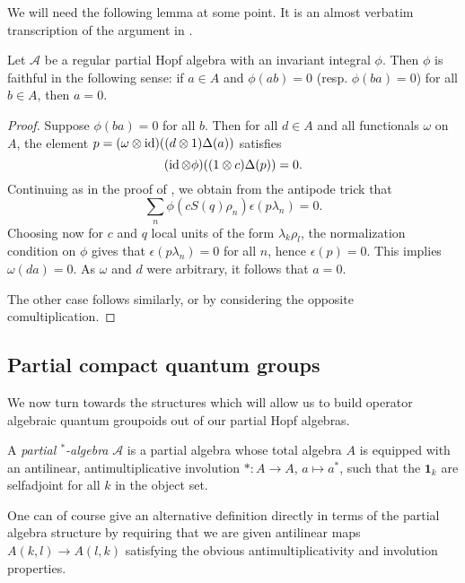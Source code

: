 We will need the following lemma at some point. It is an almost verbatim transcription of the argument in \cite[Proposition 3.4]{VDae2}.

\begin{Lem}\label{LemFaith} Let $\mathscr{A}$ be a regular partial Hopf
  algebra with an invariant integral $\phi$. Then
  $\phi$ is faithful in the following sense: if $a\in A$ and
  $\phi(ab) =0$ (resp. $\phi(ba)=0$) for all $b\in A$, then
  $a=0$.
\end{Lem} 
\begin{proof} Suppose  $\phi(ba)=0$ for all $b$. Then for all $d\in A$ and all functionals $\omega$ on $A$, the element $p = (\omega\otimes \operatorname{id})((d\otimes 1)\Delta(a))$ satisfies \[(\operatorname{id}\otimes \phi)((1\otimes c)\Delta(p)) = 0.\] Continuing as in the proof of \cite[Proposition 3.4]{VDae2}, we obtain from the antipode trick that \[\sum_n \phi(cS(q)\rho_n)\epsilon(p\lambda_n)=0.\] Choosing now for $c$ and $q$ local units of the form $\lambda_k\rho_l$, the normalization condition on $\phi$ gives that $\epsilon(p\lambda_n)=0$ for all $n$, hence $\epsilon(p)=0$. This implies $\omega(da)=0$. As $\omega$ and $d$ were arbitrary, it follows that $a=0$.

The other case follows similarly, or by considering the opposite comultiplication.
\end{proof} 



\subsection{Partial compact quantum groups}

We now turn towards the structures which will allow us to build operator algebraic quantum groupoids out of our partial Hopf algebras.

\begin{Def} A \emph{partial $^*$-algebra} $\mathscr{A}$ is a partial
  algebra whose total algebra $A$ is equipped with an antilinear,
  antimultiplicative involution $*\colon A\rightarrow A$, $ a\mapsto
  a^*$,  such that the $\mathbf{1}_k$ are selfadjoint for all $k$ in
  the object set. 
\end{Def} 

One can of course give an alternative definition directly in terms of the partial algebra structure by requiring that we are given antilinear maps $A(k,l)\rightarrow A(l,k)$ satisfying the obvious antimultiplicativity and involution properties.

